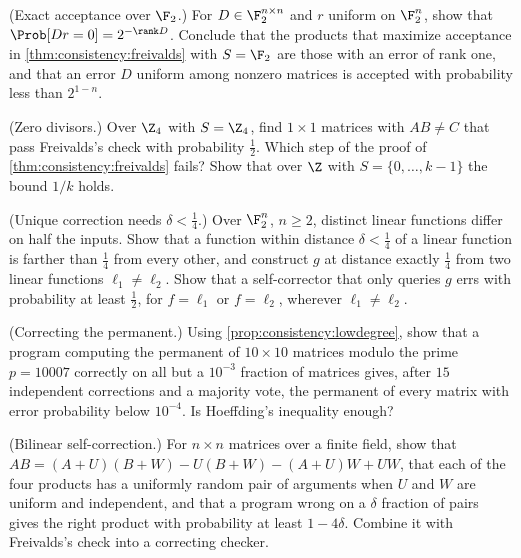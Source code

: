 \begin{refsection}
\begin{exercises}
\item \consolidation (Exact acceptance over $\F_2$.) For $D\in\F_2^{n\times n}$ and $r$ uniform on $\F_2^n$, show that $\Prob[Dr=0]=2^{-\rank D}$. Conclude that the products that maximize acceptance in \cref{thm:consistency:freivalds} with $S=\F_2$ are those with an error of rank one, and that an error $D$ uniform among nonzero matrices is accepted with probability less than $2^{1-n}$. \label{ex:consistency:rank}

\item \consolidation (Zero divisors.) Over $\Z_4$ with $S=\Z_4$, find $1\times1$ matrices with $AB\ne C$ that pass Freivalds's check with probability $\frac12$. Which step of the proof of \cref{thm:consistency:freivalds} fails? Show that over $\Z$ with $S=\{0,\dots,k-1\}$ the bound $1/k$ holds.\label{ex:consistency:zerodiv}

\item \consolidation (Unique correction needs $\delta<\frac14$.) Over $\F_2^n$, $n\ge2$, distinct linear functions differ on half the inputs. Show that a function within distance $\delta<\frac14$ of a linear function is farther than $\frac14$ from every other, and construct $g$ at distance exactly $\frac14$ from two linear functions $\ell_1\ne\ell_2$. Show that a self-corrector that only queries $g$ errs with probability at least $\frac12$, for $f=\ell_1$ or $f=\ell_2$, wherever $\ell_1\ne\ell_2$.\label{ex:consistency:quarter}

\item \consolidation (Correcting the permanent.) Using \cref{prop:consistency:lowdegree}, show that a program computing the permanent of $10\times10$ matrices modulo the prime $p=10007$ correctly on all but a $10^{-3}$ fraction of matrices gives, after $15$ independent corrections and a majority vote, the permanent of every matrix with error probability below $10^{-4}$. Is Hoeffding's inequality enough? \label{ex:consistency:permanent}

\item \variation (Bilinear self-correction.) For $n\times n$ matrices over a finite field, show that $AB=(A+U)(B+W)-U(B+W)-(A+U)W+UW$, that each of the four products has a uniformly random pair of arguments when $U$ and $W$ are uniform and independent, and that a program wrong on a $\delta$ fraction of pairs gives the right product with probability at least $1-4\delta$. Combine it with Freivalds's check into a correcting checker.\label{ex:consistency:bilinear}


\end{exercises}
\end{refsection}
